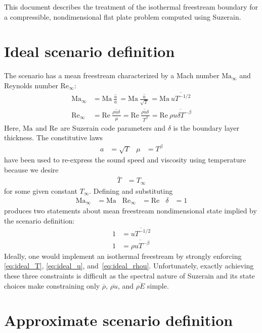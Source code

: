 \documentclass[letterpaper,11pt,nointlimits,reqno]{amsart}
\newcommand{\Mach}[1][]{\mbox{Ma}_{#1}}
\newcommand{\Reynolds}[1][]{\mbox{Re}_{#1}}
\begin{document}
This document describes the treatment of the isothermal freestream boundary for
a compressible, nondimensional flat plate problem computed using Suzerain.

\section{Ideal scenario definition}

The scenario has a mean freestream characterized by a Mach number
$\Mach[\infty]$ and Reynolds number $\Reynolds[\infty]$:
\begin{align}
  \Mach[\infty]{}
  &= \Mach{} \overline{\,\frac{u}{a}\,}
   = \Mach{} \overline{\,\frac{u}{\sqrt{T}}\,}
   = \Mach\, \overline{u T^{-1/2}}
\\
  \Reynolds[\infty]{}
  &= \Reynolds{} \overline{\,\frac{\rho u \delta\,} {\mu}}
   = \Reynolds{} \overline{\,\frac{\rho u \delta\,} {T^\beta}}
   = \Reynolds\, \overline{\rho u \delta T^{-\beta}}
\end{align}
Here, $\Mach$ and $\Reynolds$ are Suzerain code parameters and $\delta$ is the
boundary layer thickness.  The constitutive laws
\begin{align}
  a &= \sqrt{T}
&\mu &= {T}^\beta
\end{align}
have been used to re-express the sound speed and viscosity using temperature
because we desire
\begin{align}
  \label{eq:ideal_T}
  \bar{T} &= T_\infty
\end{align}
for some given constant $T_\infty$.  Defining and substituting
\begin{align}
  \Mach[\infty]{} &= \Mach
& \Reynolds[\infty]{} &= \Reynolds
& \delta &= 1
\end{align}
produces two statements about mean freestream nondimensional state implied by
the scenario definition:
\begin{align}
  \label{eq:ideal_u}
  1 &= \overline{u T^{-1/2}}
\\
  \label{eq:ideal_rhou}
  1 &= \overline{\rho u T^{-\beta}}
\end{align}
Ideally, one would implement an isothermal freestream by strongly enforcing
\eqref{eq:ideal_T}, \eqref{eq:ideal_u}, and~\eqref{eq:ideal_rhou}.
Unfortunately, exactly achieving these three constraints is difficult as the
spectral nature of Suzerain and its state choices make constraining only
$\overline{\rho}$, $\overline{\rho{}u}$, and $\overline{\rho{}E}$ simple.

\section{Approximate scenario definition}
\end{document}
